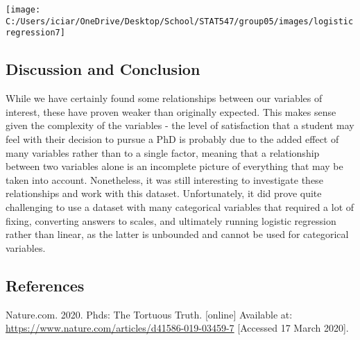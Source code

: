 \documentclass[
]{article}
\begin{document}
\texttt{[image: C:/Users/iciar/OneDrive/Desktop/School/STAT547/group05/images/logisticregression7]}

\hypertarget{discussion-and-conclusion}{%
\subsection{Discussion and Conclusion}\label{discussion-and-conclusion}}

While we have certainly found some relationships between our variables
of interest, these have proven weaker than originally expected. This
makes sense given the complexity of the variables - the level of
satisfaction that a student may feel with their decision to pursue a PhD
is probably due to the added effect of many variables rather than to a
single factor, meaning that a relationship between two variables alone
is an incomplete picture of everything that may be taken into account.
Nonetheless, it was still interesting to investigate these relationships
and work with this dataset. Unfortunately, it did prove quite
challenging to use a dataset with many categorical variables that
required a lot of fixing, converting answers to scales, and ultimately
running logistic regression rather than linear, as the latter is
unbounded and cannot be used for categorical variables.

\hypertarget{references}{%
\subsection{References}\label{references}}

Nature.com. 2020. Phds: The Tortuous Truth. {[}online{]} Available at:
\url{https://www.nature.com/articles/d41586-019-03459-7} {[}Accessed 17
March 2020{]}.
\end{document}
